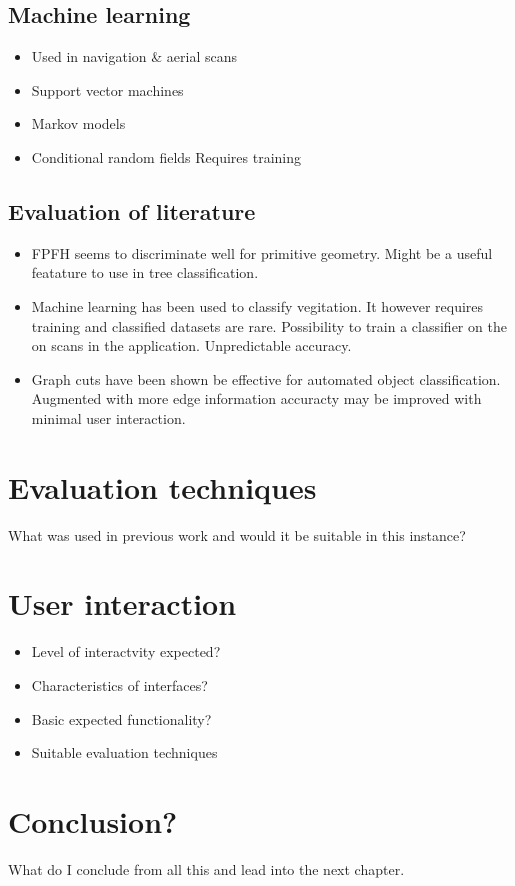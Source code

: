 	\subsection{Machine learning}
		\begin{itemize}
		\item Used in navigation & aerial scans
		\item Support vector machines
		\item Markov models
		\item Conditional random fields
		\iten Requires training
		\end{itemize}
		
	\subsection{Evaluation of literature}
		\begin{itemize}
		\item FPFH seems to discriminate well for primitive geometry. Might be a useful featature to use in tree classification.
		\item Machine learning has been used to classify vegitation. It however requires training and classified datasets are rare. Possibility to train a classifier on the on scans in the application. Unpredictable accuracy.
		\item Graph cuts have been shown be effective for automated object classification. Augmented with more edge information accuracty may be improved with minimal user interaction.
		\end{itemize}

\section{Evaluation techniques}
\begin{itemize}
	What was used in previous work and would it be suitable in this instance?
\end{itemize}
	
\section{User interaction}
	\begin{itemize}
		\item Level of interactvity expected?
		\item Characteristics of interfaces?
		\item Basic expected functionality?
		\item Suitable evaluation techniques
	\end{itemize}
		

\section{Conclusion?}
What do I conclude from all this and lead into the next chapter.		

